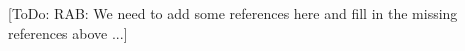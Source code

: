 \documentclass[pdf,ps2pdf,11pt]{SANDreport}
\begin{document}
[ToDo: RAB: We need to add some references here and fill in the missing
references above ...]

%
\clearpage



%
%

\end{document}
